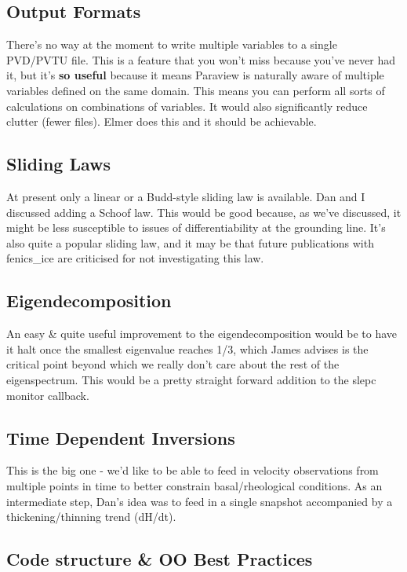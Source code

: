 \documentclass[11pt, reqno, nocenter]{article}
\begin{document}
\subsection{Output Formats}

There's no way at the moment to write multiple variables to a single PVD/PVTU file. This is a feature that you won't miss because you've never had it, but it's \textbf{so useful} because it means Paraview is naturally aware of multiple variables defined on the same domain. This means you can perform all sorts of calculations on combinations of variables. It would also significantly reduce clutter (fewer files). Elmer does this and it should be achievable.

\subsection{Sliding Laws}

At present only a linear or a Budd-style sliding law is available. Dan and I discussed adding a Schoof law. This would be good because, as we've discussed, it might be less susceptible to issues of differentiability at the grounding line. It's also quite a popular sliding law, and it may be that future publications with fenics\_ice are criticised for not investigating this law.

\subsection{Eigendecomposition} \label{sec:improveed}

An easy \& quite useful improvement to the eigendecomposition would be to have it halt once the smallest eigenvalue reaches 1/3, which James advises is the critical point beyond which we really don't care about the rest of the eigenspectrum. This would be a pretty straight forward addition to the slepc monitor callback.

\subsection{Time Dependent Inversions}

This is the big one - we'd like to be able to feed in velocity observations from multiple points in time to better constrain basal/rheological conditions. As an intermediate step, Dan's idea was to feed in a single snapshot accompanied by a thickening/thinning trend (dH/dt).

\subsection{Code structure \& OO Best Practices}
\end{document}
